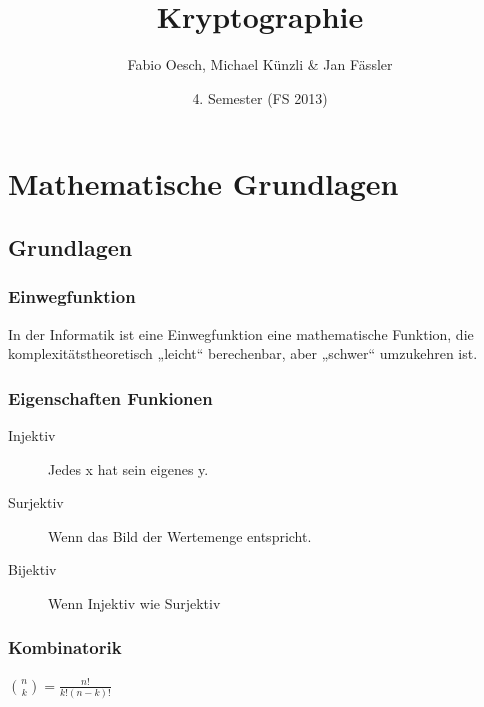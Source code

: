 \documentclass[10pt]{article}
\title{
	\vspace{5cm}
	Kryptographie
}
\author{Fabio Oesch,  Michael Künzli \& Jan Fässler}
\date{4. Semester (FS 2013)}
\begin{document}
\maketitle
\thispagestyle{fancy}

\newpage

\tableofcontents	  	


\newpage
\setcounter{page}{1}

\section{Mathematische Grundlagen}
\subsection{Grundlagen}
\subsubsection{Einwegfunktion}
In der Informatik ist eine Einwegfunktion eine mathematische Funktion, die komplexitätstheoretisch „leicht“ berechenbar, aber „schwer“ umzukehren ist. 
\subsubsection{Eigenschaften Funkionen}
\begin{description}
\item [Injektiv] Jedes x hat sein eigenes y.
\item [Surjektiv] Wenn das Bild der Wertemenge entspricht.
\item [Bijektiv] Wenn Injektiv wie Surjektiv 
\end{description}
\subsubsection{Kombinatorik}
$\binom{n}{k} = \frac{n!}{k!(n-k)!}$
\end{document}
